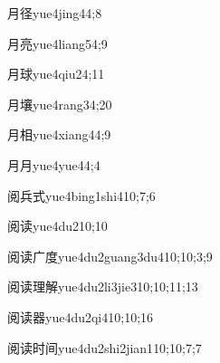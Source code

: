 \begin{verbete}{月径}{yue4jing4}{4;8}
\end{verbete}

\begin{verbete}{月亮}{yue4liang5}{4;9}
\end{verbete}

\begin{verbete}{月球}{yue4qiu2}{4;11}
\end{verbete}

\begin{verbete}{月壤}{yue4rang3}{4;20}
\end{verbete}

\begin{verbete}{月相}{yue4xiang4}{4;9}
\end{verbete}

\begin{verbete}{月月}{yue4yue4}{4;4}
\end{verbete}

\begin{verbete}{阅兵式}{yue4bing1shi4}{10;7;6}
\end{verbete}

\begin{verbete}{阅读}{yue4du2}{10;10}
\end{verbete}

\begin{verbete}{阅读广度}{yue4du2guang3du4}{10;10;3;9}
\end{verbete}

\begin{verbete}{阅读理解}{yue4du2li3jie3}{10;10;11;13}
\end{verbete}

\begin{verbete}{阅读器}{yue4du2qi4}{10;10;16}
\end{verbete}

\begin{verbete}{阅读时间}{yue4du2shi2jian1}{10;10;7;7}
\end{verbete}

